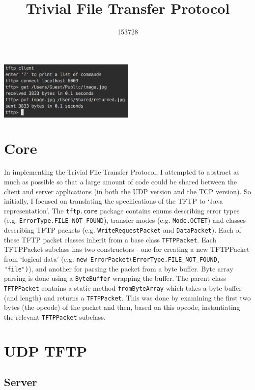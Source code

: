 \documentclass[a4paper]{article}
\title{\vspace{-5ex}Trivial File Transfer Protocol}
\author{153728}
\date{}
\newcommand{\code}{\texttt}
\begin{document}
\maketitle
\vspace{-4ex}

\begin{center}
\includegraphics[width=0.5\textwidth]{image}
\end{center}

\section{Core}

In implementing the Trivial File Transfer Protocol, I attempted to abstract as much as possible so that a large amount of code could be shared between the client and server applications (in both the UDP version and the TCP version). So initially, I focused on translating the specifications of the TFTP to `Java representation'. The \code{tftp.core} package contains enums describing error types (e.g. \code{ErrorType.FILE\_NOT\_FOUND}), transfer modes (e.g. \code{Mode.OCTET}) and classes describing TFTP packets (e.g. \code{WriteRequestPacket} and \code{DataPacket}). Each of these TFTP packet classes inherit from a base class \code{TFTPPacket}. Each TFTPPacket subclass has two constructors - one for creating a new TFTPPacket from `logical data' (e.g. \code{new ErrorPacket(ErrorType.FILE\_NOT\_FOUND, "file")}), and another for parsing the packet from a byte buffer. Byte array parsing is done using a \code{ByteBuffer} wrapping the buffer. The parent class \code{TFTPPacket} contains a static method \code{fromByteArray} which takes a byte buffer (and length) and returns a \code{TFTPPacket}. This was done by examining the first two bytes (the opcode) of the packet and then, based on this opcode, instantiating the relevant \code{TFTPPacket} subclass.

\section{UDP TFTP}

\subsection{Server}
\end{document}
